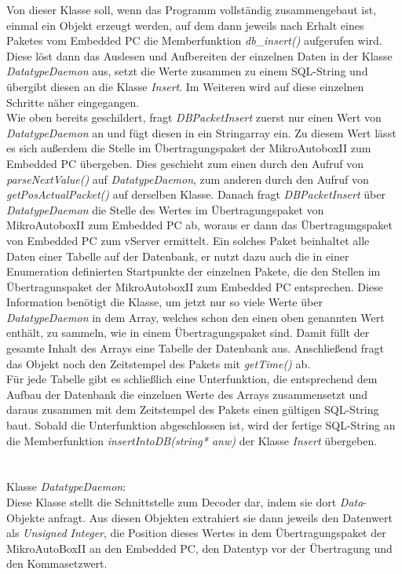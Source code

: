 \documentclass[fontsize = 12pt, paper = a4]{scrreprt}
\begin{document}
Von dieser Klasse soll, wenn das Programm vollständig zusammengebaut ist, einmal ein Objekt erzeugt werden, auf dem dann jeweils nach Erhalt eines Paketes vom Embedded PC die Memberfunktion \textit{db\_insert()} aufgerufen wird. Diese löst dann das Auslesen und Aufbereiten der einzelnen Daten in der Klasse \textit{DatatypeDaemon} aus, setzt die Werte zusammen zu einem SQL-String und übergibt diesen an die Klasse \textit{Insert}. Im Weiteren wird auf diese einzelnen Schritte näher eingegangen.\\
Wie oben bereits geschildert, fragt \textit{DBPacketInsert} zuerst nur einen Wert von \textit{DatatypeDaemon} an und fügt diesen in ein Stringarray ein. Zu diesem Wert lässt es sich außerdem die Stelle im Übertragungspaket der MikroAutoboxII zum Embedded PC übergeben. Dies geschieht zum einen durch den Aufruf von \textit{parseNextValue()} auf \textit{DatatypeDaemon}, zum anderen durch den Aufruf von \textit{getPosActualPacket()} auf derselben Klasse. Danach fragt \textit{DBPacketInsert} über \textit{DatatypeDaemon} die Stelle des Wertes im Übertragungspaket von MikroAutoboxII zum Embedded PC ab, woraus er dann das Übertragungspaket von Embedded PC zum vServer ermittelt. Ein solches Paket beinhaltet alle Daten einer Tabelle auf der Datenbank, er nutzt dazu auch die in einer Enumeration definierten Startpunkte der einzelnen Pakete, die den Stellen im Übertragunspaket der MikroAutoboxII zum Embedded PC entsprechen. Diese Information benötigt die Klasse, um jetzt nur so viele Werte über \textit{DatatypeDaemon} in dem Array, welches schon den einen oben genannten Wert enthält, zu sammeln, wie in einem Übertragungspaket sind. Damit füllt der gesamte Inhalt des Arrays eine Tabelle der Datenbank aus. Anschließend fragt das Objekt noch den Zeitstempel des Pakets mit \textit{getTime()} ab.\\
Für jede Tabelle gibt es schließlich eine Unterfunktion, die entsprechend dem Aufbau der Datenbank die einzelnen Werte des Arrays zusammensetzt und daraus zusammen mit dem Zeitstempel des Pakets einen gültigen SQL-String baut. Sobald die Unterfunktion abgeschlossen ist, wird der fertige SQL-String an die Memberfunktion \textit{insertIntoDB(string* anw)} der Klasse \textit{Insert} übergeben.\\
\\
\\
Klasse \textit{DatatypeDaemon}:\\
Diese Klasse stellt die Schnittstelle zum Decoder dar, indem sie dort \textit{Data}-Objekte anfragt. Aus diesen Objekten extrahiert sie dann jeweils den Datenwert als \textit{Unsigned Integer}, die Position dieses Wertes in dem Übertragungspaket der MikroAutoBoxII an den Embedded PC, den Datentyp vor der Übertragung und den Kommasetzwert.\\
\end{document}
